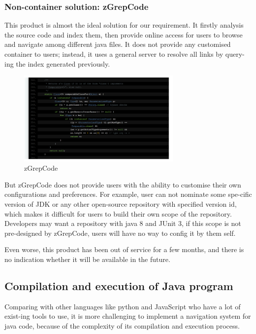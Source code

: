 \documentclass[runningheads]{llncs}
\begin{document}
\subsubsection{Non-container solution: zGrepCode\cite{zgrepcode}}
This product is almost the ideal solution for our requirement. It firstly analysis the source code and index them, then provide online access for users to browse and navigate among different java files. It does not provide any customised container to users; instead, it uses a general server to resolve all links by query-ing the index generated previously.

\begin{figure}[H]
	\centering
	\includegraphics[width=8cm]{pic/zGrepCode.png}
	\caption{zGrepCode}
	\label{zGrepCode}
\end{figure}

But zGrepCode does not provide users with the ability to customise their own configurations and preferences. For example, user can not nominate some spe-cific version of JDK or any other open-source repository with specified version id, which makes it difficult for users to build their own scope of the repository. Developers may want a repository with java 8 and JUnit 3, if this scope is not pre-designed by zGrepCode, users will have no way to config it by them self.

Even worse, this product has been out of service for a few months, and there is no indication whether it will be available in the future.

\subsection{Compilation and execution of Java program}
Comparing with other languages like python and JavaScript who have a lot of exist-ing tools to use, it is more challenging to implement a navigation system for java code, because of the complexity of its compilation and execution process.
\end{document}
